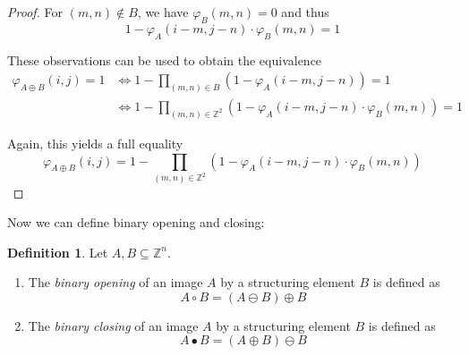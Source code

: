 \documentclass[a4paper,12pt]{article}
\theoremstyle{plain}
\theoremstyle{definition}
\newtheorem{definition}[theorem]{Definition}
\theoremstyle{remark}
\begin{document}
\begin{proof}
	For $(m, n) \notin B$, we have $\varphi_B(m, n) = 0$ and thus
	\begin{equation*}
		1 - \varphi_A(i - m, j - n) \cdot \varphi_B(m, n) = 1
	\end{equation*}
	
	These observations can be used to obtain the equivalence
	\begin{align*}
		\varphi_{A \oplus B}(i, j) = 1 &\Leftrightarrow 1 - \prod_{(m, n) \in B} ( 1 - \varphi_A(i - m, j - n) ) = 1 \\
		&\Leftrightarrow 1 - \prod_{(m, n) \in \mathbb{Z}^2} ( 1 - \varphi_A(i - m, j - n) \cdot \varphi_B(m, n) ) = 1
	\end{align*}
	
	Again, this yields a full equality
	\begin{equation*}
		\varphi_{A \oplus B}(i, j) = 1 - \prod_{(m, n) \in \mathbb{Z}^2} ( 1 - \varphi_A(i - m, j - n) \cdot \varphi_B(m, n) )
	\end{equation*}
\end{proof}

Now we can define binary opening and closing:
\begin{definition}
	Let $A, B \subseteq \mathbb{Z}^n$.
	\begin{enumerate}
		\item The \emph{binary opening} of an image $A$ by a structuring element $B$ is defined as
		\begin{equation*}
			A \circ B = (A \ominus B) \oplus B
		\end{equation*}
		\item The \emph{binary closing} of an image $A$ by a structuring element $B$ is defined as
		\begin{equation*}
			A \bullet B = (A \oplus B) \ominus B
		\end{equation*}
	\end{enumerate}
\end{definition}
\end{document}
